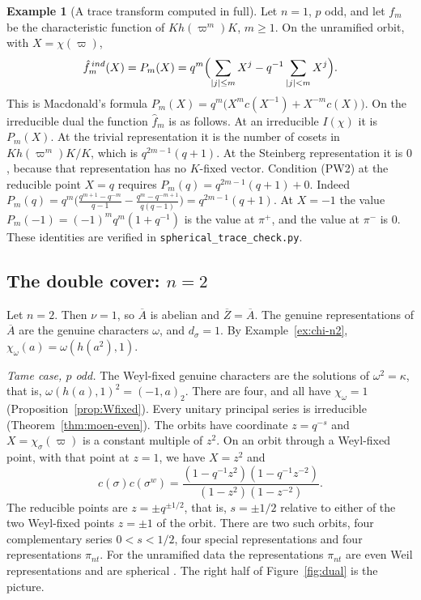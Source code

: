 \documentclass[12pt,letterpaper]{article}
\numberwithin{equation}{section}
\theoremstyle{definition}
\newtheorem{example}[theorem]{Example}
\newcommand{\vp}{\varpi}
\newcommand{\bA}{\overline{A}}
\newcommand{\bZ}{\overline{Z}}
\begin{document}
\begin{example}[A trace transform computed in full]\label{ex:macdonald}
Let $n=1$, $p$ odd, and let $f_m$ be the characteristic function of $Kh(\vp^m)K$, $m\ge1$.
On the unramified orbit, with $X=\chi(\vp)$,
\[
\hat f_m^{\,ind}(X)=P_m(X)=q^m\Bigl(\sum_{|j|\le m}X^j-q^{-1}\sum_{|j|<m}X^j\Bigr).
\]
This is Macdonald's formula $P_m(X)=q^m\bigl(X^mc(X^{-1})+X^{-m}c(X)\bigr)$.  On the
irreducible dual the function $\hat f_m$ is as follows.  At an irreducible $I(\chi)$ it is
$P_m(X)$.  At the trivial representation it is the number of cosets in $Kh(\vp^m)K/K$,
which is $q^{2m-1}(q+1)$.  At the Steinberg representation it is $0$, because that
representation has no $K$-fixed vector.  Condition (PW2) at the reducible point $X=q$
requires $P_m(q)=q^{2m-1}(q+1)+0$.  Indeed
$P_m(q)=q^m\bigl(\frac{q^{m+1}-q^{-m}}{q-1}-\frac{q^{m}-q^{-m+1}}{q(q-1)}\bigr)=q^{2m-1}(q+1)$.
At $X=-1$ the value $P_m(-1)=(-1)^mq^m(1+q^{-1})$ is the value at $\pi^+$, and the value at
$\pi^-$ is $0$.  These identities are verified in \texttt{spherical\_trace\_check.py}.
\end{example}

\subsection{\texorpdfstring{The double cover: $n=2$}{The double cover: n=2}}

Let $n=2$.  Then $\nu=1$, so $\bA$ is abelian and $\bZ=\bA$.  The genuine representations of
$\bA$ are the genuine characters $\omega$, and $d_\sigma=1$.  By Example~\ref{ex:chi-n2},
$\chi_\omega(a)=\omega(h(a^2),1)$.

\emph{Tame case, $p$ odd.}  The Weyl-fixed genuine characters are the solutions of
$\omega^2=\kappa$, that is, $\omega(h(a),1)^2=(-1,a)_2$.  There are four, and all have
$\chi_\omega=1$ (Proposition~\ref{prop:Wfixed}).  Every unitary principal series is
irreducible (Theorem~\ref{thm:moen-even}).  The orbits have coordinate $z=q^{-s}$ and
$X=\chi_\sigma(\vp)$ is a constant multiple of $z^2$.  On an orbit through a Weyl-fixed
point, with that point at $z=1$, we have $X=z^2$ and
\[
c(\sigma)c(\sigma^w)=\frac{(1-q^{-1}z^2)(1-q^{-1}z^{-2})}{(1-z^2)(1-z^{-2})}.
\]
The reducible points are $z=\pm q^{\pm1/2}$, that is, $s=\pm1/2$ relative to either of the
two Weyl-fixed points $z=\pm1$ of the orbit.  There are two such orbits, four
complementary series $0<s<1/2$, four special representations and four representations
$\pi_{nt}$.  For the unramified data the representations $\pi_{nt}$ are even Weil
representations and are spherical \cite{Ge76}.  The right half of Figure~\ref{fig:dual}
is the picture.
\end{document}
